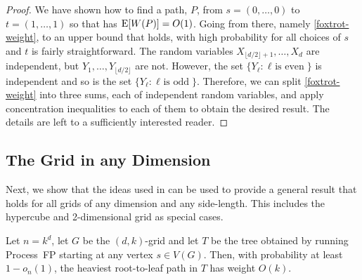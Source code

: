 \documentclass[lotsofwhite]{patmorin}
\begin{document}
\begin{proof}
  We have shown how to find a path, $P$, from $s=(0,\ldots,0)$ to
  $t=(1,\ldots,1)$ so that has $\mathrm{E}[W(P)]=O(1)$.  Going from there,
  namely \eqref{foxtrot-weight}, to an upper bound that holds, with high
  probability for all choices of $s$ and $t$ is fairly straightforward.
  The random variables $X_{\lfloor d/2\rfloor+1},\ldots,X_d$ are
  independent, but $Y_1,\ldots,Y_{\lfloor d/2\rfloor}$ are not. However,
  the set $\{Y_\ell : \mbox{$\ell$ is even} \}$ is independent and so is
  the set $\{Y_\ell : \mbox{$\ell$ is odd} \}$.  Therefore, we can split
  \eqref{foxtrot-weight} into three sums, each of independent random
  variables, and apply concentration inequalities to each of them to
  obtain the desired result. The details are left to a sufficiently
  interested reader.
\end{proof}

\subsection{The Grid in any Dimension}

Next, we show that the ideas used in 
can be used to provide a general result that holds for all grids of
any dimension and any side-length.  This includes the hypercube and
2-dimensional grid as special cases.

\begin{thm}
   Let $n=k^d$, let $G$ be the $(d,k)$-grid
   and let $T$ be the tree obtained by running Process~FP starting at
   any vertex $s\in V(G)$.  Then, with probability at least $1-o_n(1)$,
   the heaviest root-to-leaf path in $T$ has weight $O(k)$.
\end{thm}
\end{document}

